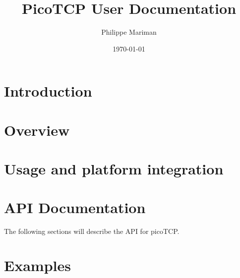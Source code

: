 %






\usepackage{hyperref}
\usepackage{draftwatermark}




\title{PicoTCP User Documentation}
\author{Philippe Mariman}
\date{\today}
\maketitle

\thispagestyle{empty}



\tableofcontents

\chapter{Introduction}
\label{chap:intro}
%

\chapter{Overview}
\label{chap:overview}
%


\chapter{Usage and platform integration}
\label{chap:usage}
%


\chapter{API Documentation}
\label{chap:api_doc}
The following sections will describe the API for picoTCP.





\chapter{Examples}
\label{chap:examples}
%



